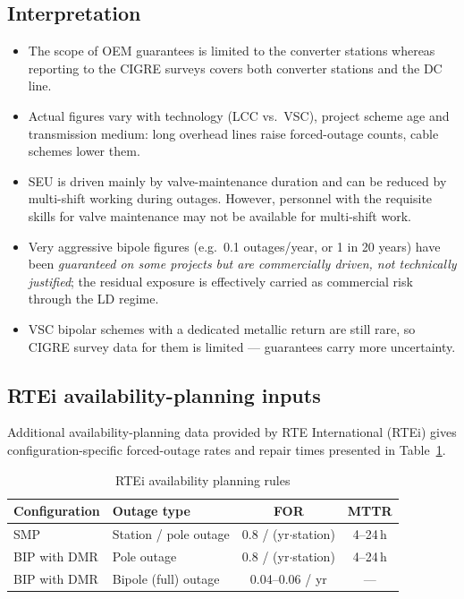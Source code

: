 \subsection{Interpretation}
\begin{itemize}\setlength{\itemsep}{0.25em}
      \item The scope of OEM guarantees is limited to the converter stations 
            whereas reporting to the CIGRE surveys covers both converter stations and the DC line. 
      \item Actual figures vary with technology (LCC vs.\ VSC), project scheme age and
            transmission medium: long overhead lines raise forced-outage counts,
            cable schemes lower them.
      \item SEU is driven mainly by valve-maintenance duration and can be reduced by
            multi-shift working during outages. However, personnel with the requisite skills 
            for valve maintenance may not be available for multi-shift work.
      \item Very aggressive bipole figures (e.g.\ 0.1 outages/year, or 1 in 20 years)
            have been \emph{guaranteed on some projects but are commercially driven,
            not technically justified}; the residual exposure is effectively carried
            as commercial risk through the LD regime.
      \item VSC bipolar schemes with a dedicated metallic return are still rare, so
            CIGRE survey data for them is limited --- guarantees carry more
            uncertainty.
\end{itemize}

\subsection{RTEi availability-planning inputs}
Additional availability-planning data provided by RTE International (RTEi) gives
configuration-specific forced-outage rates and repair times presented in Table~\ref{tab:rtei-raliability}.


\begin{table}[htbp]
      \centering
      \begin{tabular}{@{}l l c c@{}}
      \toprule
      \textbf{Configuration} & \textbf{Outage type} & \textbf{FOR} & \textbf{MTTR} \\
      \midrule
      SMP            & Station / pole outage & 0.8 / (yr$\cdot$station) & 4--24\,h \\
      BIP with DMR   & Pole outage           & 0.8 / (yr$\cdot$station) & 4--24\,h \\
      BIP with DMR   & Bipole (full) outage  & 0.04--0.06 / yr          & --- \\
      \bottomrule
      \end{tabular}
      \caption{RTEi availability planning rules} \label{tab:rtei-raliability}
\end{table}

